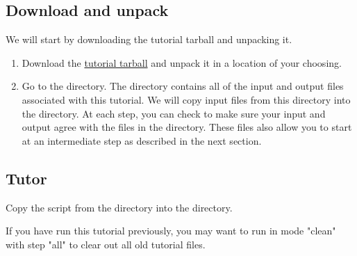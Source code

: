 \subsection{Download and unpack}

We will start by downloading the tutorial tarball and unpacking it.

\begin{enumerate}
\item Download the \href{http://www.geodynamics.org:8080/cig/Members/willic3/pylithusers/pylith0.8/pylith-0.8\_tutorials.tgz}{tutorial
    tarball}
  and unpack it in a location of your choosing.

  \begin{screen}
    \shellprompt{}
  \end{screen}
  
\item Go to the  directory.
  The  directory contains all of the input and
  output files associated with this tutorial. We will copy input files
  from this directory into the  directory. At each
  step, you can check to make sure your input and output agree with
  the files in the  directory. These files also
  allow you to start at an intermediate step as described in the next
  section.

  \begin{screen}
    \shellprompt{}
  \end{screen}

\end{enumerate}

\subsection{Tutor}

Copy the  script from the 
directory into the  directory. 

\begin{tip}
  If you have run this tutorial previously, you may want to run
   in mode "clean" with step "all" to clear out all
  old tutorial files.
\end{tip}

\begin{screen}
\shellprompt{}
\shellprompt{}
\shellprompt{}
\end{screen}

